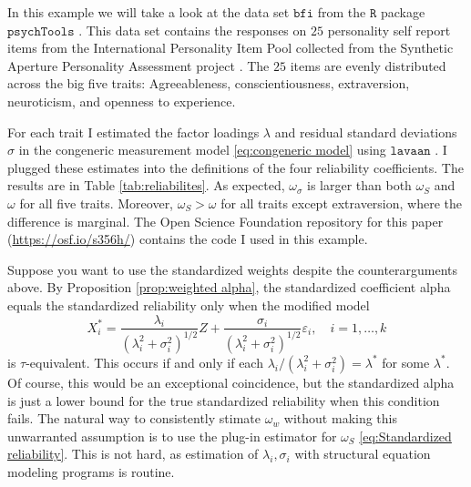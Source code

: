 \documentclass[twoside]{article}
\renewcommand{\sqrt}[1]{{(#1)^{1/2}}}
\begin{document}
\begin{example}
\label{exa:reliabilities}


In this example we will take a look at the data set $\texttt{bfi}$ from the $\texttt{R}$ \citep{Team2013-tt} package $\texttt{psychTools}$ \citep{Revelle2019-te}. This data set contains the responses on $25$ personality self report items from the International Personality Item Pool \citep{Goldberg1999-iz} collected from the Synthetic Aperture Personality Assessment project \citep{Revelle2017-ez}. The $25$ items are evenly distributed across the big five traits: Agreeableness, conscientiousness, extraversion, neuroticism, and openness to experience. 

For each trait I estimated the factor loadings $\lambda$ and residual standard deviations $\sigma$ in the congeneric measurement model \eqref{eq:congeneric model} using  $\texttt{lavaan}$ \citep{Rosseel2012-yg}. I plugged these estimates into the definitions of the four reliability coefficients. The results are in Table \ref{tab:reliabilites}. As expected, $\omega_\sigma$ is larger than both $\omega_S$ and $\omega$ for all five traits. Moreover, $\omega_S > \omega$ for all traits except extraversion, where the difference is marginal. The Open Science Foundation repository for this paper (\url{https://osf.io/s356h/}) contains the code I used in this example.
\end{example} 

Suppose you want to use the standardized weights despite the counterarguments above. By Proposition \ref{prop:weighted alpha}, the standardized coefficient alpha equals the standardized reliability only when the modified model
\begin{equation}\label{eq:std-modified model}
X_{i}^{*}=\frac{\lambda_{i}}{\sqrt{\lambda_{i}^{2}+\sigma_{i}^{2}}}Z+\frac{\sigma_{i}}{\sqrt{\lambda_{i}^{2}+\sigma_{i}^{2}}}\varepsilon_{i}, \quad i=1,\ldots,k    \end{equation}
is $\tau$-equivalent. This occurs if and only if each $\lambda_{i}/(\lambda_{i}^{2}+\sigma_{i}^{2})=\lambda^{*}$
for some $\lambda^{*}$. Of course, this would be an exceptional coincidence, but the standardized alpha is just a lower bound for the true standardized reliability when this condition fails. The natural way to consistently stimate $\omega_w$ without making this unwarranted assumption is to use the plug-in estimator for $\omega_S$ \eqref{eq:Standardized reliability}. This is not hard, as estimation of $\lambda_{i},\sigma_{i}$ with structural equation modeling programs is routine.
\end{document}
